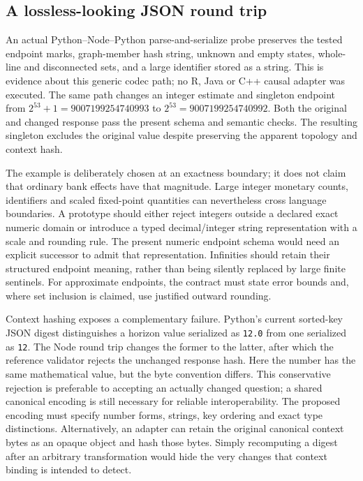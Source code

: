 \subsection{A lossless-looking JSON round trip}

An actual Python--Node--Python parse-and-serialize probe preserves the tested
endpoint marks, graph-member hash string, unknown and empty states, whole-line
and disconnected sets, and a large identifier stored as a string. This is
evidence about this generic codec path; no R, Java or C++ causal adapter was
executed. The same path changes an integer estimate and singleton endpoint
from \(2^{53}+1=9007199254740993\) to
\(2^{53}=9007199254740992\). Both the original and changed response pass the
present schema and semantic checks. The resulting singleton excludes the
original value despite preserving the apparent topology and context hash.
\citep{exec16_topology_codec}

The example is deliberately chosen at an exactness boundary; it does not
claim that ordinary bank effects have that magnitude. Large integer monetary
counts, identifiers and scaled fixed-point quantities can nevertheless cross
language boundaries. A prototype should either reject integers outside a
declared exact numeric domain or introduce a typed decimal/integer string
representation with a scale and rounding rule. The present numeric endpoint
schema would need an explicit successor to admit that representation.
Infinities should retain their structured endpoint meaning, rather than being
silently replaced by large finite sentinels. For approximate endpoints, the
contract must state error bounds and, where set inclusion is claimed, use
justified outward rounding.

Context hashing exposes a complementary failure. Python's current sorted-key
JSON digest distinguishes a horizon value serialized as \texttt{12.0} from
one serialized as \texttt{12}. The Node round trip changes the former to the
latter, after which the reference validator rejects the unchanged response
hash. Here the number has the same mathematical value, but the byte convention
differs. This conservative rejection is preferable to accepting an actually
changed question; a shared canonical encoding is still necessary for reliable
interoperability. The proposed encoding must specify number forms, strings,
key ordering and exact type distinctions. Alternatively, an adapter can retain
the original canonical context bytes as an opaque object and hash those bytes.
Simply recomputing a digest after an arbitrary transformation would hide the
very changes that context binding is intended to detect.
\citep{exec16_topology_codec}

